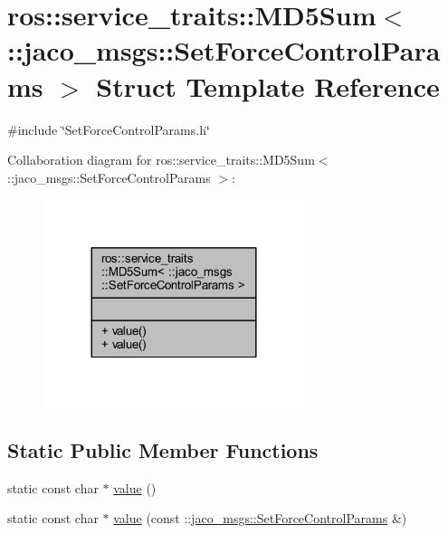 \hypertarget{structros_1_1service__traits_1_1MD5Sum_3_01_1_1jaco__msgs_1_1SetForceControlParams_01_4}{}\section{ros\+:\+:service\+\_\+traits\+:\+:M\+D5\+Sum$<$ \+:\+:jaco\+\_\+msgs\+:\+:Set\+Force\+Control\+Params $>$ Struct Template Reference}
\label{structros_1_1service__traits_1_1MD5Sum_3_01_1_1jaco__msgs_1_1SetForceControlParams_01_4}


{\ttfamily \#include \char`\"{}Set\+Force\+Control\+Params.\+h\char`\"{}}



Collaboration diagram for ros\+:\+:service\+\_\+traits\+:\+:M\+D5\+Sum$<$ \+:\+:jaco\+\_\+msgs\+:\+:Set\+Force\+Control\+Params $>$\+:
\nopagebreak
\begin{figure}[H]
\begin{center}
\leavevmode
\includegraphics[width=216pt]{d0/d24/structros_1_1service__traits_1_1MD5Sum_3_01_1_1jaco__msgs_1_1SetForceControlParams_01_4__coll__graph}
\end{center}
\end{figure}
\subsection*{Static Public Member Functions}
\begin{DoxyCompactItemize}
\item 
static const char $\ast$ \hyperlink{structros_1_1service__traits_1_1MD5Sum_3_01_1_1jaco__msgs_1_1SetForceControlParams_01_4_aa4e2d79648d6c6f5a83f603191506063}{value} ()
\item 
static const char $\ast$ \hyperlink{structros_1_1service__traits_1_1MD5Sum_3_01_1_1jaco__msgs_1_1SetForceControlParams_01_4_a8e7a53309ce6b3fd93e8583bdcc37f84}{value} (const \+::\hyperlink{namespacejaco__msgs_df/d4f/structjaco__msgs_1_1SetForceControlParams}{jaco\+\_\+msgs\+::\+Set\+Force\+Control\+Params} \&)
\end{DoxyCompactItemize}


